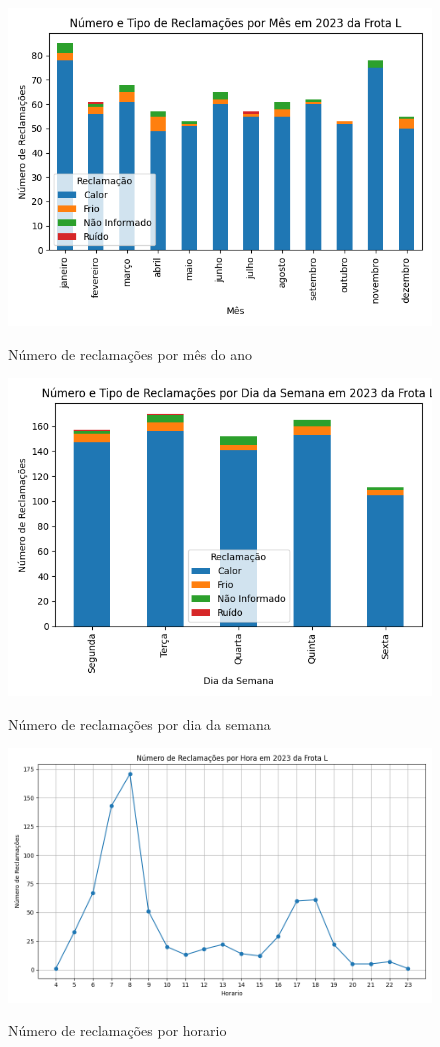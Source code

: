 \documentclass[acronym,symbols,table]{fei}
\begin{document}
\begin{figure}[!htb]
    \centering
    \caption{Número de reclamações por mês do ano}
    \includegraphics[width=0.8\linewidth]{Imagens/reclamacao_mes.png}
    \label{fig:reclamacao_mes}
\end{figure}

\begin{figure}[!htb]
    \centering
    \caption{Número de reclamações por dia da semana}
    \includegraphics[width=0.7\linewidth]{Imagens/reclamacao_semana.png}
    \label{fig:reclamacao_semana}
\end{figure}

\begin{figure}[!htb]
    \centering
    \caption{Número de reclamações por horario}
    \includegraphics[width=0.7\linewidth]{Imagens/reclamacao_hora.png}
    \label{fig:reclamacao_hora}
\end{figure}
\end{document}
